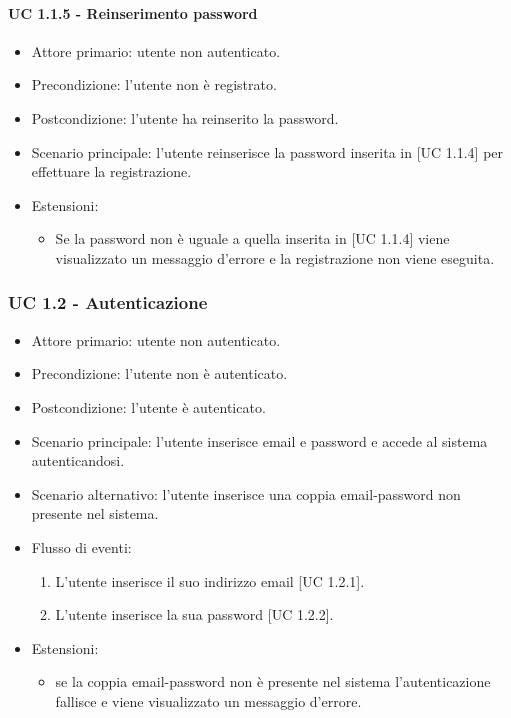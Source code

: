         \paragraph{UC 1.1.5 - Reinserimento password}
            \begin{itemize}
                \item Attore primario: utente non autenticato.
                \item Precondizione: l'utente non è registrato.
                \item Postcondizione: l'utente ha reinserito la password.
                \item Scenario principale: l'utente reinserisce la password inserita in [UC 1.1.4] per effettuare la registrazione.
                \item Estensioni:
                    \begin{itemize}
                        \item Se la password non è uguale a quella inserita in [UC 1.1.4] viene visualizzato un messaggio d'errore e la registrazione non viene eseguita.
                    \end{itemize}
            \end{itemize}
    \subsubsection{UC 1.2 - Autenticazione}
        \begin{itemize}
            \item Attore primario: utente non autenticato.
            \item Precondizione: l'utente non è autenticato.
            \item Postcondizione: l'utente è autenticato.
            \item Scenario principale: l'utente inserisce email e password e accede al sistema autenticandosi.
            \item Scenario alternativo: l'utente inserisce una coppia email-password non presente nel sistema.
            \item Flusso di eventi:
                \begin{enumerate}
                    \item L'utente inserisce il suo indirizzo email [UC 1.2.1].
                    \item L'utente inserisce la sua password [UC 1.2.2].
                \end{enumerate}
            \item Estensioni:
                \begin{itemize}
                    \item se la coppia email-password non è presente nel sistema l'autenticazione fallisce e viene visualizzato un messaggio d'errore.
                \end{itemize}
        \end{itemize}
